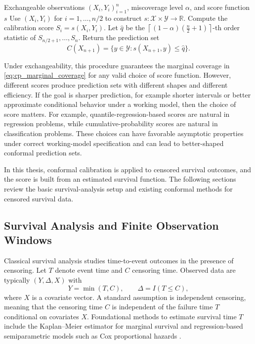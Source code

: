 \documentclass[12pt]{article}
\makeatletter
\let\thesis@section\subsection
\let\thesis@subsection\subsubsection
\renewcommand{\section}{\thesis@section}
\renewcommand{\subsection}{\thesis@subsection}
\makeatother
\begin{document}
\begin{algorithm}[H]
\caption{{Basic Split Conformal Prediction}}

\begin{algorithmic}[1]
\Require Exchangeable observations $(X_i,Y_i)_{i=1}^n$, miscoverage level $\alpha$, and score function $s$
\State Use $(X_i,Y_i)$ for $i=1,\ldots,n/2$ to construct $s:\mathcal{X}\times\mathcal{Y}\to\mathbb{R}$.
    \State Compute the calibration score $S_i=s(X_i,Y_i)$.
\EndFor
\State Let $\hat q$ be the $\left\lceil (1-\alpha)\left(\frac{n}{2}+1\right)\right\rceil$-th order statistic of $S_{n/2+1},\ldots,S_n$.
\State Return the prediction set
\[
C(X_{n+1})=\{y\in\mathcal{Y}: s(X_{n+1},y)\le \hat q\}.
\]
\end{algorithmic}

\end{algorithm}

Under exchangeability, this procedure guarantees the marginal coverage in \eqref{eq:cp_marginal_coverage} for any valid choice of score function. However, different scores produce prediction sets with different shapes and different efficiency. If the goal is sharper prediction, for example shorter intervals or better approximate conditional behavior under a working model, then the choice of score matters. For example, quantile-regression-based scores are natural in regression problems, while cumulative-probability scores are natural in classification problems. These choices can have favorable asymptotic properties under correct working-model specification and can lead to better-shaped conformal prediction sets. \citep{angelopoulos2024theoretical}

In this thesis, conformal calibration is applied to censored survival outcomes, and the score is built from an estimated survival function. The following sections review the basic survival-analysis setup and existing conformal methods for censored survival data.



\section{Survival Analysis and Finite Observation Windows}
Classical survival analysis studies time-to-event outcomes in the presence of censoring.
Let $T$ denote event time and $C$ censoring time.
Observed data are typically $(Y,\Delta,X)$ with
\[
Y=\min(T,C),\qquad \Delta=I(T\le C),
\]
where $X$ is a covariate vector. A standard assumption is independent censoring, meaning that
the censoring time $C$ is independent of the failure time $T$
conditional on covariates $X$.
Foundational methods to estimate survival time $T$ include the Kaplan--Meier estimator for marginal survival and regression-based semiparametric models such as Cox proportional hazards \citep{kaplan1958nonparametric,cox1972regression}.
\end{document}
